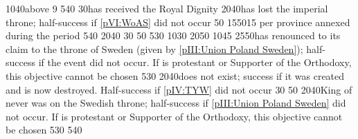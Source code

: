 {10}{40}{\EU@objEachProvince above 9}%
%
%
{5}{40}{\EU@objAlliance}%
%
%
{}{30}{\paysmajeurPrusse has received the Royal Dignity}%
%
%
{20}{40}{\paysmajeurAutriche has lost the imperial throne; half-success if
  \ref{pVI:WoAS} did not occur}%
%
%
{}{50}{\EU@objSilesie}%
%
%
%
{15}{50}{15 \VPs per province annexed during the period}%
%
%
{5}{40}{\EU@objAlliance}%
%
%
{20}{40}{\EU@objSYW}
%
%
{}{30}{\EU@objFranceContained}%
%
%
{}{50}{\EU@objSilesie}%
%
 
%
%
{5}{30}{\EU@objBaltiqueTrade}%
%
%
\EUobjective{}{\continentAmerica}{\COL/\TP}%
{10}{30}{}%
%
%
{20}{50}{}%
%
%
{10}{45}{}%
%
%
{25}{50}{\paysmajeurPologne has renounced to its claim to the throne of Sweden
  (given by \ref{pIII:Union Poland Sweden}); half-success if the event did not
  occur. If \paysmajeurPologne is protestant or Supporter of the Orthodoxy,
  this objective cannot be chosen}%
%
%
%
{5}{30}{\EU@objBaltiqueTrade}%
%
%
{20}{40}{\GE does not exist; success if it was created and is now
  destroyed. Half-success if \ref{pIV:TYW} did not occur}%
%
%
{}{30}{}%
%
%
{}{50}{\EU@objDMB}%
%
%
{20}{40}{King of  never was on the Swedish throne;
  half-success if \ref{pIII:Union Poland Sweden} did not occur. If
  \paysmajeurPologne is protestant or Supporter of the Orthodoxy, this
  objective cannot be chosen}%
%
%
%
{5}{30}{\EU@objBaltiqueTrade}%
%
%
{5}{40}{\EU@objEachCOLTP}%
%
%
